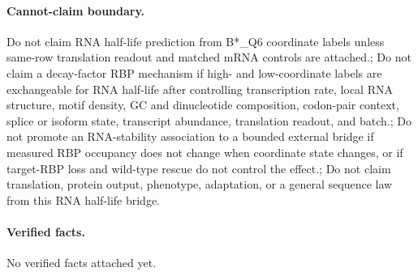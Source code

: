 \paragraph{Cannot-claim boundary.} Do not claim RNA half-life prediction from B*\_Q6 coordinate labels unless same-row translation readout and matched mRNA controls are attached.; Do not claim a decay-factor RBP mechanism if high- and low-coordinate labels are exchangeable for RNA half-life after controlling transcription rate, local RNA structure, motif density, GC and dinucleotide composition, codon-pair context, splice or isoform state, transcript abundance, translation readout, and batch.; Do not promote an RNA-stability association to a bounded external bridge if measured RBP occupancy does not change when coordinate state changes, or if target-RBP loss and wild-type rescue do not control the effect.; Do not claim translation, protein output, phenotype, adaptation, or a general sequence law from this RNA half-life bridge.

\paragraph{Verified facts.}
No verified facts attached yet.
